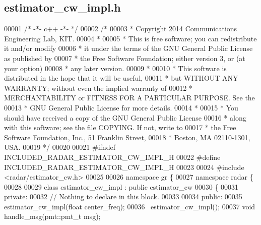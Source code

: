 \subsection{estimator\+\_\+cw\+\_\+impl.\+h}
\label{estimator__cw__impl_8h_source}

\begin{DoxyCode}
00001 \textcolor{comment}{/* -*- c++ -*- */}
00002 \textcolor{comment}{/* }
00003 \textcolor{comment}{ * Copyright 2014 Communications Engineering Lab, KIT.}
00004 \textcolor{comment}{ * }
00005 \textcolor{comment}{ * This is free software; you can redistribute it and/or modify}
00006 \textcolor{comment}{ * it under the terms of the GNU General Public License as published by}
00007 \textcolor{comment}{ * the Free Software Foundation; either version 3, or (at your option)}
00008 \textcolor{comment}{ * any later version.}
00009 \textcolor{comment}{ * }
00010 \textcolor{comment}{ * This software is distributed in the hope that it will be useful,}
00011 \textcolor{comment}{ * but WITHOUT ANY WARRANTY; without even the implied warranty of}
00012 \textcolor{comment}{ * MERCHANTABILITY or FITNESS FOR A PARTICULAR PURPOSE.  See the}
00013 \textcolor{comment}{ * GNU General Public License for more details.}
00014 \textcolor{comment}{ * }
00015 \textcolor{comment}{ * You should have received a copy of the GNU General Public License}
00016 \textcolor{comment}{ * along with this software; see the file COPYING.  If not, write to}
00017 \textcolor{comment}{ * the Free Software Foundation, Inc., 51 Franklin Street,}
00018 \textcolor{comment}{ * Boston, MA 02110-1301, USA.}
00019 \textcolor{comment}{ */}
00020  
00021 \textcolor{preprocessor}{#ifndef INCLUDED\_RADAR\_ESTIMATOR\_CW\_IMPL\_H}
00022 \textcolor{preprocessor}{#define INCLUDED\_RADAR\_ESTIMATOR\_CW\_IMPL\_H}
00023 
00024 \textcolor{preprocessor}{#include <radar/estimator_cw.h>}
00025 
00026 \textcolor{keyword}{namespace }gr \{
00027   \textcolor{keyword}{namespace }radar \{
00028 
00029     \textcolor{keyword}{class }estimator_cw_impl : \textcolor{keyword}{public} estimator_cw
00030     \{
00031      \textcolor{keyword}{private}:
00032       \textcolor{comment}{// Nothing to declare in this block.}
00033 
00034      \textcolor{keyword}{public}:
00035       estimator_cw_impl(\textcolor{keywordtype}{float} center_freq);
00036       ~estimator_cw_impl();
00037       \textcolor{keywordtype}{void} handle_msg(pmt::pmt\_t msg);

\end{DoxyCode}
